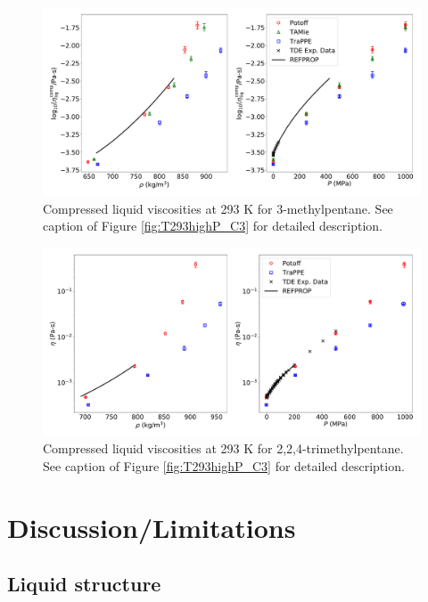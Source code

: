 \documentclass[preprint,review,12pt]{elsarticle}
\begin{document}
	\begin{figure}[htb!]
		\centering
		\includegraphics[width=6.4in]{compare_REFPROP_T293highP_3MPentane.pdf}
		\caption{Compressed liquid viscosities at 293 K for 3-methylpentane. See caption of Figure \ref{fig:T293highP_C3} for detailed description.}
		\label{fig:T293highP_3MP}
	\end{figure} 
	
	\begin{figure}[htb!]
		\centering
		\includegraphics[width=6.4in]{compare_REFPROP_T293highP_IC8H18_without_devPlots.pdf}
		\caption{Compressed liquid viscosities at 293 K for 2,2,4-trimethylpentane. See caption of Figure \ref{fig:T293highP_C3} for detailed description.}
		\label{fig:T293highP_IC8}
	\end{figure} 
	
	\section{Discussion/Limitations} \label{Discussion/Limitations}
	
	\subsection{Liquid structure} \label{sec:RDF}
	
\end{document}
